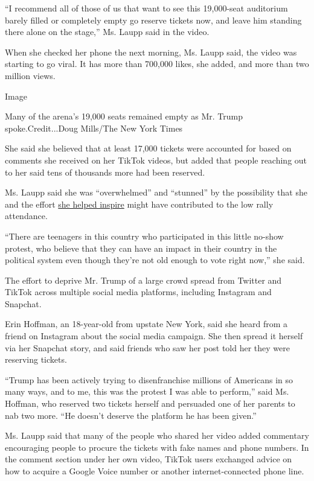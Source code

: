 ``I recommend all of those of us that want to see this 19,000-seat
auditorium barely filled or completely empty go reserve tickets now, and
leave him standing there alone on the stage,'' Ms. Laupp said in the
video.

When she checked her phone the next morning, Ms. Laupp said, the video
was starting to go viral. It has more than 700,000 likes, she added, and
more than two million views.

Image

Many of the arena's 19,000 seats remained empty as Mr. Trump
spoke.Credit...Doug Mills/The New York Times

She said she believed that at least 17,000 tickets were accounted for
based on comments she received on her TikTok videos, but added that
people reaching out to her said tens of thousands more had been
reserved.

Ms. Laupp said she was ``overwhelmed'' and ``stunned'' by the
possibility that she and the effort
\href{https://www.tiktok.com/@maryjolaupp/video/6840619115585998085}{she
helped inspire} might have contributed to the low rally attendance.

``There are teenagers in this country who participated in this little
no-show protest, who believe that they can have an impact in their
country in the political system even though they're not old enough to
vote right now,'' she said.

The effort to deprive Mr. Trump of a large crowd spread from Twitter and
TikTok across multiple social media platforms, including Instagram and
Snapchat.

Erin Hoffman, an 18-year-old from upstate New York, said she heard from
a friend on Instagram about the social media campaign. She then spread
it herself via her Snapchat story, and said friends who saw her post
told her they were reserving tickets.

``Trump has been actively trying to disenfranchise millions of Americans
in so many ways, and to me, this was the protest I was able to
perform,'' said Ms. Hoffman, who reserved two tickets herself and
persuaded one of her parents to nab two more. ``He doesn't deserve the
platform he has been given.''

Ms. Laupp said that many of the people who shared her video added
commentary encouraging people to procure the tickets with fake names and
phone numbers. In the comment section under her own video, TikTok users
exchanged advice on how to acquire a Google Voice number or another
internet-connected phone line.


